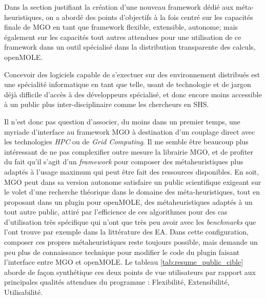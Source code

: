Dans la section justifiant la création d'une nouveau framework dédié aux méta-heuristiques, on a abordé des points d'objectifs à la fois centré sur les capacités finale de MGO en tant que framework flexible, extensible, autonome; mais également sur les capacités tout autres attendues pour une utilisation de ce framework dans un outil spécialisé dans la distribution transparente des calculs, openMOLE.

Concevoir des logiciels capable de s'exectuer sur des environnement distribués est une spécialité informatique en tant que telle, usant de technologie et de jargon déjà difficile d'accès à des développeurs spécialisé, et donc encore moins accessible à un public plus inter-disciplinaire comme les chercheurs en SHS. 

Il n'est donc pas question d'associer, du moins dans un premier temps, une myriade d'interface au framework MGO à destination d'un couplage direct avec les technologies \textit{HPC} ou de \textit{Grid Computing}. Il me semble être beaucoup plus intéressant de ne pas complexifier outre mesure la librairie MGO, et de profiter du fait qu'il s'agit d'un \textit{framework} pour composer des métaheuristiques plus adaptés à l'usage maximum qui peut être fait des ressources disponibles. En soit, MGO peut dans sa version autonome satisfaire un public scientifique exigeant sur le volet d'une recherche théorique dans le domaine des méta-heuristiques, tout en proposant dans un plugin pour openMOLE, des métaheuristiques adaptés à un tout autre public, attiré par l'efficience de ces algorithmes pour des cas d'utilisation très spécifique qui n'ont que très peu avoir avec les \textit{benchmarks} que l'ont trouve par exemple dans la littérature des EA. Dans cette configuration, composer ces propres métaheuristiques reste toujours possible, mais demande un peu plus de connaissance technique pour modifier le code du plugin faisant l'interface entre MGO et openMOLE. Le tableau \ref{tab:resume_public_cible} aborde de façon synthétique ces deux points de vue utilisateurs par rapport aux principales qualités attendues du programme : Flexibilité, Extensibilité, Utilisabilité.


